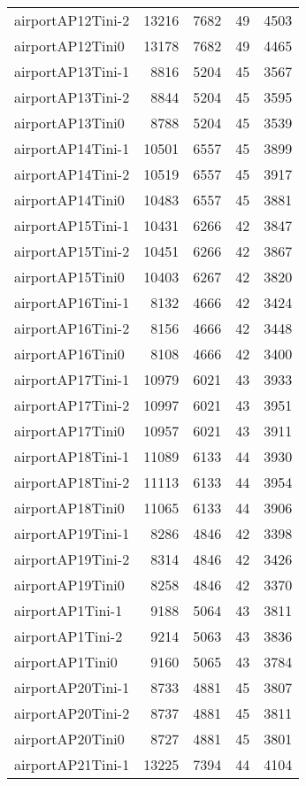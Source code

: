 \begin{longtable}{lrrrr}
airportAP12Tini-2 & 13216 & 7682 & 49 & 4503 \\
airportAP12Tini0 & 13178 & 7682 & 49 & 4465 \\
airportAP13Tini-1 & 8816 & 5204 & 45 & 3567 \\
airportAP13Tini-2 & 8844 & 5204 & 45 & 3595 \\
airportAP13Tini0 & 8788 & 5204 & 45 & 3539 \\
airportAP14Tini-1 & 10501 & 6557 & 45 & 3899 \\
airportAP14Tini-2 & 10519 & 6557 & 45 & 3917 \\
airportAP14Tini0 & 10483 & 6557 & 45 & 3881 \\
airportAP15Tini-1 & 10431 & 6266 & 42 & 3847 \\
airportAP15Tini-2 & 10451 & 6266 & 42 & 3867 \\
airportAP15Tini0 & 10403 & 6267 & 42 & 3820 \\
airportAP16Tini-1 & 8132 & 4666 & 42 & 3424 \\
airportAP16Tini-2 & 8156 & 4666 & 42 & 3448 \\
airportAP16Tini0 & 8108 & 4666 & 42 & 3400 \\
airportAP17Tini-1 & 10979 & 6021 & 43 & 3933 \\
airportAP17Tini-2 & 10997 & 6021 & 43 & 3951 \\
airportAP17Tini0 & 10957 & 6021 & 43 & 3911 \\
airportAP18Tini-1 & 11089 & 6133 & 44 & 3930 \\
airportAP18Tini-2 & 11113 & 6133 & 44 & 3954 \\
airportAP18Tini0 & 11065 & 6133 & 44 & 3906 \\
airportAP19Tini-1 & 8286 & 4846 & 42 & 3398 \\
airportAP19Tini-2 & 8314 & 4846 & 42 & 3426 \\
airportAP19Tini0 & 8258 & 4846 & 42 & 3370 \\
airportAP1Tini-1 & 9188 & 5064 & 43 & 3811 \\
airportAP1Tini-2 & 9214 & 5063 & 43 & 3836 \\
airportAP1Tini0 & 9160 & 5065 & 43 & 3784 \\
airportAP20Tini-1 & 8733 & 4881 & 45 & 3807 \\
airportAP20Tini-2 & 8737 & 4881 & 45 & 3811 \\
airportAP20Tini0 & 8727 & 4881 & 45 & 3801 \\
airportAP21Tini-1 & 13225 & 7394 & 44 & 4104 \\

\end{longtable}
